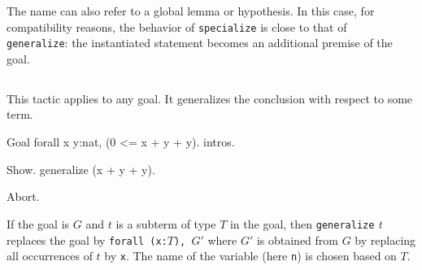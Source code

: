 \begin{Variants}
      The name {\ident} can also refer to a global lemma or
      hypothesis. In this case, for compatibility reasons, the
      behavior of {\tt specialize} is close to that of {\tt
        generalize}: the instantiated statement becomes an additional
      premise of the goal.

  \begin{ErrMsgs}
  \item {}
  \item {}
  \end{ErrMsgs}


\end{Variants}

\subsection{}
\label{generalize}

This tactic applies to any goal. It generalizes the conclusion with
respect to some term.

\Example

\begin{coq_eval}
Goal forall x y:nat, (0 <= x + y + y).
intros.
\end{coq_eval}
\begin{coq_example}
Show.
generalize (x + y + y).
\end{coq_example}

\begin{coq_eval}
Abort.
\end{coq_eval}

If the goal is $G$ and $t$ is a subterm of type $T$ in the goal, then
{\tt generalize} \textit{t} replaces the goal by {\tt forall (x:$T$), $G'$}
where $G'$ is obtained from $G$ by replacing all occurrences of $t$ by
{\tt x}. The name of the variable (here {\tt n}) is chosen based on $T$.

